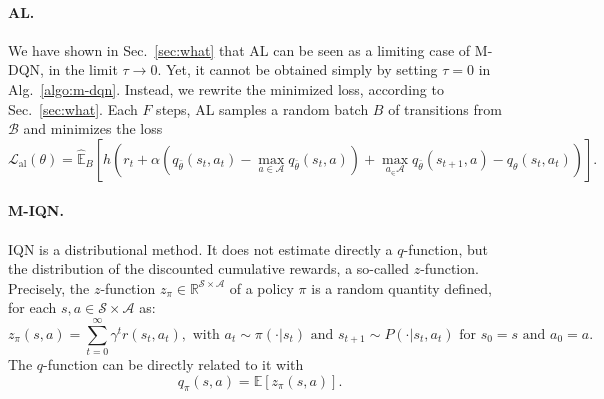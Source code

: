 \documentclass{article}
\newcommand{\states}{\mathcal{S}}
\newcommand{\actions}{\mathcal{A}}
\begin{document}
\paragraph{AL.} We have shown in Sec.~\ref{sec:what} that AL can be seen as a limiting case of M-DQN, in the limit $\tau\rightarrow 0$. Yet, it cannot be obtained simply by setting $\tau=0$ in Alg.~\ref{algo:m-dqn}. Instead, we rewrite the minimized loss, according to Sec.~\ref{sec:what}. Each $F$ steps, AL samples a random batch  $B$ of transitions from $\mathcal{B}$ and minimizes the loss
\begin{equation}
    \mathcal{L}_{\text{al}}(\theta) = \hat{\mathbb{E}}_B \left[h \left(r_t + \alpha\left(q_{\bar\theta}(s_t,a_t) - \max_{a\in\actions} q_{\bar\theta}(s_t,a) \right)+ \max_{a_\in\actions}q_{\bar\theta}(s_{t+1},a)  -  q_\theta(s_t,a_t)\right)\right].
\end{equation}

\paragraph{M-IQN.} IQN is a distributional method. It does not estimate directly a $q$-function, but the distribution of the discounted cumulative rewards, a so-called $z$-function. Precisely, the $z$-function $z_\pi \in \mathbb{R}^{\states\times\actions}$ of a policy $\pi$  is a random quantity defined, for each $s,a \in \states\times\actions$ as:
\begin{equation}
  z_\pi(s,a) = \sum_{t=0}^\infty\gamma^tr(s_t,a_t), \text{ with }  a_t \sim \pi(\cdot|s_t) \text{ and } s_{t+1} \sim P(\cdot|s_t, a_t) \text{ for } s_0=s \text{ and } a_0=a.
\end{equation}
The $q$-function can be directly related to it with
\begin{equation}
  q_\pi(s,a) = \mathbb{E}\left[z_\pi(s,a)\right].
\end{equation}
\end{document}
